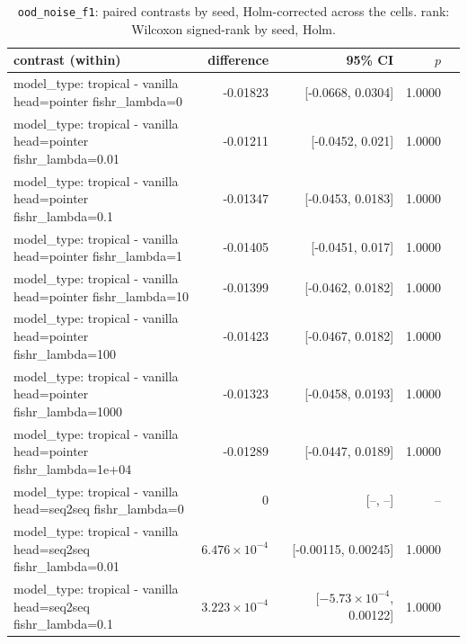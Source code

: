 \documentclass[10pt]{article}
\makeatletter
\newcommand{\stackcell}[1]{\begin{tabular}[t]{@{}l@{}}#1\end{tabular}}
\makeatother
\begin{document}
{\small
\begin{longtable}{lrrrl}
\caption{\texttt{ood\_noise\_f1}: paired contrasts by seed, Holm-corrected across the cells. rank: Wilcoxon signed-rank by seed, Holm.}\label{tab:paired-ood_noise_f1}\\
\toprule
contrast (within) & difference & 95\% CI & $p$ & \\
\midrule
\endhead
\stackcell{model\_type: tropical - vanilla\\\footnotesize head=pointer fishr\_lambda=0 } & -0.01823 & [-0.0668, 0.0304] & 1.0000 & \\
\stackcell{model\_type: tropical - vanilla\\\footnotesize head=pointer fishr\_lambda=0.01 } & -0.01211 & [-0.0452, 0.021] & 1.0000 & \\
\stackcell{model\_type: tropical - vanilla\\\footnotesize head=pointer fishr\_lambda=0.1 } & -0.01347 & [-0.0453, 0.0183] & 1.0000 & \\
\stackcell{model\_type: tropical - vanilla\\\footnotesize head=pointer fishr\_lambda=1 } & -0.01405 & [-0.0451, 0.017] & 1.0000 & \\
\stackcell{model\_type: tropical - vanilla\\\footnotesize head=pointer fishr\_lambda=10 } & -0.01399 & [-0.0462, 0.0182] & 1.0000 & \\
\stackcell{model\_type: tropical - vanilla\\\footnotesize head=pointer fishr\_lambda=100 } & -0.01423 & [-0.0467, 0.0182] & 1.0000 & \\
\stackcell{model\_type: tropical - vanilla\\\footnotesize head=pointer fishr\_lambda=1000 } & -0.01323 & [-0.0458, 0.0193] & 1.0000 & \\
\stackcell{model\_type: tropical - vanilla\\\footnotesize head=pointer fishr\_lambda=1e+04 } & -0.01289 & [-0.0447, 0.0189] & 1.0000 & \\
\stackcell{model\_type: tropical - vanilla\\\footnotesize head=seq2seq fishr\_lambda=0 } & 0 & [--, --] & -- & \\
\stackcell{model\_type: tropical - vanilla\\\footnotesize head=seq2seq fishr\_lambda=0.01 } & $6.476\times10^{-4}$ & [-0.00115, 0.00245] & 1.0000 & \\
\stackcell{model\_type: tropical - vanilla\\\footnotesize head=seq2seq fishr\_lambda=0.1 } & $3.223\times10^{-4}$ & [$-5.73\times10^{-4}$, 0.00122] & 1.0000 & \\

\end{longtable}}
\end{document}
